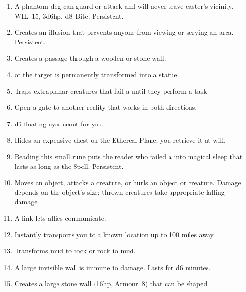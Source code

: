 \documentclass[itdr]{subfiles}
\begin{document}
\begin{enumerate}
	\item {} A phantom dog can guard or attack and will never leave caster's vicinity. WIL~15, 3d6hp, d8~Bite. Persistent.
	\item {} Creates an illusion that prevents anyone from viewing or scrying an area. Persistent.
	\vfill
	\break
	\item {} Creates a passage through a wooden or stone wall.
	\item {}  or the target is permanently transformed into a statue.
	\item {} Traps extraplanar creatures that fail a  until they perform a task.
	\item {} Open a gate to another reality that works in both directions.
	\item {} d6 floating eyes scout for you.
	\item {} Hides an expensive chest on the Ethereal Plane; you retrieve it at will.
	\item {} Reading this small rune puts the reader who failed a  into magical sleep that lasts as long as the Spell. Persistent.
	\item {} Moves an object, attacks a creature, or hurls an object or creature. Damage \mbox{depends} on the object's size; thrown creatures take appropriate falling damage.
	\item {} A link lets allies communicate.
	\item {} Instantly transports you to a known location up to 100 miles away.
	\item {} Transforms mud to rock or rock to mud.
	\item {} A large invisible wall is immune to damage. Lasts for d6 minutes.
	\item {} Creates a large stone wall (16hp, Armour~8) that can be shaped.
\end{enumerate}

\vfill
\break
\end{document}
